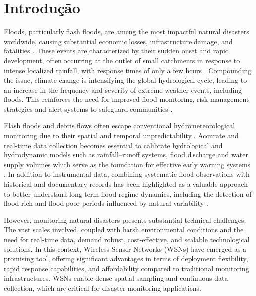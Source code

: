 \chapter{Introdução} \label{cap:intro}


Floods, particularly flash floods, are among the most impactful natural disasters worldwide, causing substantial economic losses, infrastructure damage, and fatalities \cite{jonkman_2005_global, santos_2014_indstria}. These events are characterized by their sudden onset and rapid development, often occurring at the outlet of small catchments in response to intense localized rainfall, with response times of only a few hours \cite{borga_2014_hydrogeomorphic} . Compounding the issue, climate change is intensifying the global hydrological cycle, leading to an increase in the frequency and severity of extreme weather events, including floods. This reinforces the need for improved flood monitoring, risk management strategies and alert systems to safeguard communities \cite{hall_2014_understanding, bragana_2024_anlise}.

Flash floods and debris flows often escape conventional hydrometeorological monitoring due to their spatial and temporal unpredictability \cite{borga_2014_hydrogeomorphic,hall_2014_understanding}. Accurate and real-time data collection becomes essential to calibrate hydrological and hydrodynamic models such as rainfall–runoff systems, flood discharge and water supply volumes which serve as the foundation for effective early warning systems \cite{lin_2020_semantic, lo_2015_visual, iqbal_2021_how}. In addition to instrumental data, combining systematic flood observations with historical and documentary records has been highlighted as a valuable approach to better understand long-term flood regime dynamics, including the detection of flood-rich and flood-poor periods influenced by natural variability \cite{borga_2014_hydrogeomorphic,hall_2014_understanding,iqbal_2021_how, bragana_2024_anlise}.

However, monitoring natural disasters presents substantial technical challenges. The vast scales involved, coupled with harsh environmental conditions and the need for real-time data, demand robust, cost-effective, and scalable technological solutions. In this context, Wireless Sensor Networks (WSNs) have emerged as a promising tool, offering significant advantages in terms of deployment flexibility, rapid response capabilities, and affordability compared to traditional monitoring infrastructures. WSNs enable dense spatial sampling and continuous data collection, which are critical for disaster monitoring applications.\cite{chen_2013_natural, ferreira_2023_conception, pule_2017_wireless}

